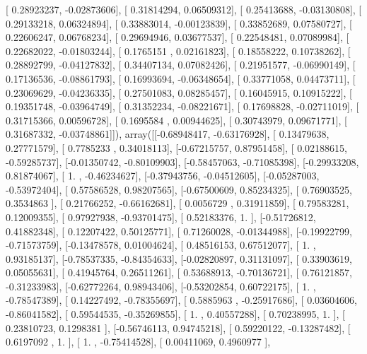 \documentclass{article}
\begin{document}
       [ 0.28923237, -0.02873606],
       [ 0.31814294,  0.06509312],
       [ 0.25413688, -0.03130808],
       [ 0.29133218,  0.06324894],
       [ 0.33883014, -0.00123839],
       [ 0.33852689,  0.07580727],
       [ 0.22606247,  0.06768234],
       [ 0.29694946,  0.03677537],
       [ 0.22548481,  0.07089984],
       [ 0.22682022, -0.01803244],
       [ 0.1765151 ,  0.02161823],
       [ 0.18558222,  0.10738262],
       [ 0.28892799, -0.04127832],
       [ 0.34407134,  0.07082426],
       [ 0.21951577, -0.06990149],
       [ 0.17136536, -0.08861793],
       [ 0.16993694, -0.06348654],
       [ 0.33771058,  0.04473711],
       [ 0.23069629, -0.04236335],
       [ 0.27501083,  0.08285457],
       [ 0.16045915,  0.10915222],
       [ 0.19351748, -0.03964749],
       [ 0.31352234, -0.08221671],
       [ 0.17698828, -0.02711019],
       [ 0.31715366,  0.00596728],
       [ 0.1695584 ,  0.00944625],
       [ 0.30743979,  0.09671771],
       [ 0.31687332, -0.03748861]]), array([[-0.68948417, -0.63176928],
       [ 0.13479638,  0.27771579],
       [ 0.7785233 ,  0.34018113],
       [-0.67215757,  0.87951458],
       [ 0.02188615, -0.59285737],
       [-0.01350742, -0.80109903],
       [-0.58457063, -0.71085398],
       [-0.29933208,  0.81874067],
       [ 1.        , -0.46234627],
       [-0.37943756, -0.04512605],
       [-0.05287003, -0.53972404],
       [ 0.57586528,  0.98207565],
       [-0.67500609,  0.85234325],
       [ 0.76903525,  0.3534863 ],
       [ 0.21766252, -0.66162681],
       [ 0.0056729 ,  0.31911859],
       [ 0.79583281,  0.12009355],
       [ 0.97927938, -0.93701475],
       [ 0.52183376,  1.        ],
       [-0.51726812,  0.41882348],
       [ 0.12207422,  0.50125771],
       [ 0.71260028, -0.01344988],
       [-0.19922799, -0.71573759],
       [-0.13478578,  0.01004624],
       [ 0.48516153,  0.67512077],
       [ 1.        ,  0.93185137],
       [-0.78537335, -0.84354633],
       [-0.02820897,  0.31131097],
       [ 0.33903619,  0.05055631],
       [ 0.41945764,  0.26511261],
       [ 0.53688913, -0.70136721],
       [ 0.76121857, -0.31233983],
       [-0.62772264,  0.98943406],
       [-0.53202854,  0.60722175],
       [ 1.        , -0.78547389],
       [ 0.14227492, -0.78355697],
       [ 0.5885963 , -0.25917686],
       [ 0.03604606, -0.86041582],
       [ 0.59544535, -0.35269855],
       [ 1.        ,  0.40557288],
       [ 0.70238995,  1.        ],
       [ 0.23810723,  0.1298381 ],
       [-0.56746113,  0.94745218],
       [ 0.59220122, -0.13287482],
       [ 0.6197092 ,  1.        ],
       [ 1.        , -0.75414528],
       [ 0.00411069,  0.4960977 ],
\end{document}
